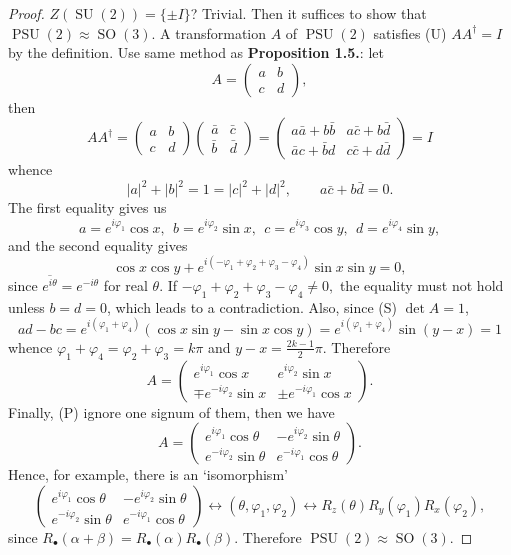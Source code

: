 \begin{proof}
$Z(\operatorname{SU}(2)) = \{\pm I\}$? Trivial. Then it suffices to show that $\operatorname{PSU}(2)\approx \operatorname{SO}(3)$. A transformation $A$ of $\operatorname{PSU}(2)$ satisfies \textsf{(U)} $AA^\dagger = I$ by the definition. Use same method as \textbf{Proposition 1.5.}: let $$A=\begin{pmatrix}a&b\\c&d\end{pmatrix},$$ then $$AA^\dagger = \begin{pmatrix}a&b\\c&d\end{pmatrix}\begin{pmatrix}\bar a&\bar c\\\bar b&\bar d\end{pmatrix} = \begin{pmatrix}a\bar a+b\bar b&a\bar c+b\bar d\\\bar a c+\bar b d&c\bar c + d\bar d\end{pmatrix}=I$$ whence $$|a|^2 + |b|^2 = 1 = |c|^2 + |d|^2, \qquad a\bar c + b\bar d = 0.$$ The first equality gives us $$a = e^{i\varphi_1}\cos x,~~b = e^{i\varphi_2}\sin x,~~c = e^{i\varphi_3}\cos y,~~d = e^{i\varphi_4}\sin y,$$ and the second equality gives $$\cos x \cos y + e^{i(-\varphi_1+\varphi_2+\varphi_3-\varphi_4)}\sin x \sin y = 0,$$ since $\overline{e^{i\theta}} = e^{-i\theta}$ for real $\theta$. If $-\varphi_1+\varphi_2+\varphi_3-\varphi_4 \ne 0,$ the equality must not hold unless $b=d=0$, which leads to a contradiction. Also, since \textsf{(S)} $\operatorname{det}A = 1$, $$ad-bc = e^{i(\varphi_1 + \varphi_4)}(\cos x \sin y - \sin x \cos y) = e^{i(\varphi_1 + \varphi_4)} \sin(y-x) = 1$$ whence $\varphi_1 + \varphi_4 =\varphi_2 + \varphi_3 = k\pi$ and $y-x = \frac{2k-1}{2} \pi.$ Therefore $$A = \begin{pmatrix}e^{i\varphi_1}\cos x&e^{i\varphi_2}\sin x \\ \mp e^{- i\varphi_2}\sin x&\pm e^{-i\varphi_1}\cos x \end{pmatrix}.$$ Finally, \textsf{(P)} ignore one signum of them, then we have $$A = \begin{pmatrix}e^{i\varphi_1}\cos \theta & - e^{i\varphi_2}\sin \theta \\  e^{- i\varphi_2}\sin \theta& e^{-i\varphi_1}\cos \theta \end{pmatrix}.$$ Hence, for example, there is an `isomorphism' $$\begin{pmatrix}e^{i\varphi_1}\cos \theta & - e^{i\varphi_2}\sin \theta \\  e^{- i\varphi_2}\sin \theta& e^{-i\varphi_1}\cos \theta \end{pmatrix} \leftrightarrow (\theta, \varphi_1, \varphi_2) \leftrightarrow R_z(\theta)R_y(\varphi_1)R_x(\varphi_2),$$ since $R_\bullet (\alpha + \beta) = R_\bullet (\alpha)R_\bullet (\beta).$ Therefore $\operatorname{PSU}(2)\approx \operatorname{SO}(3).$
\end{proof}

